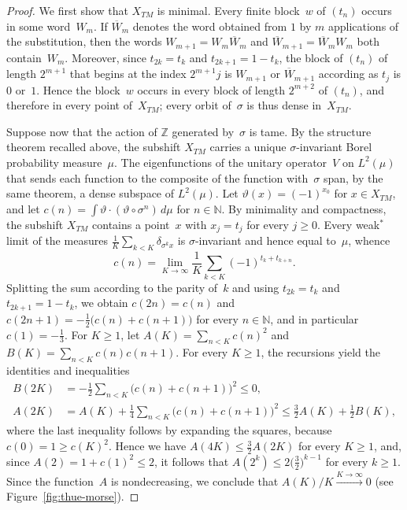 \documentclass[psamsfonts]{amsart}
\theoremstyle{definition}
\theoremstyle{remark}
\numberwithin{equation}{section}
\begin{document}
\begin{proof}
We first show that $X_{TM}$ is minimal.
Every finite block~$w$ of $(t_n)$ occurs in some word~$W_m$.
If $\overline{W}_m$ denotes the word obtained from $1$ by $m$ applications of the substitution, then the words $W_{m+1}=W_m\overline{W}_m$ and $\overline{W}_{m+1}=\overline{W}_mW_m$ both contain~$W_m$.
Moreover, since $t_{2k}=t_k$ and $t_{2k+1}=1-t_k$, the block of $(t_n)$ of length $2^{m+1}$ that begins at the index $2^{m+1}j$ is $W_{m+1}$ or $\overline{W}_{m+1}$ according as $t_j$ is $0$ or~$1$.
Hence the block~$w$ occurs in every block of length $2^{m+2}$ of $(t_n)$, and therefore in every point of~$X_{TM}$;
every orbit of~$\sigma$ is thus dense in~$X_{TM}$.

Suppose now that the action of $\mathbb{Z}$ generated by~$\sigma$ is tame.
By the structure theorem recalled above, the subshift $X_{TM}$ carries a unique $\sigma$-invariant Borel probability measure~$\mu$.
The eigenfunctions of the unitary operator~$V$ on $L^2(\mu)$ that sends each function to the composite of the function with~$\sigma$ span, by the same theorem, a dense subspace of $L^2(\mu)$.
Let $\vartheta(x)=(-1)^{x_0}$ for $x\in X_{TM}$, and let $c(n)=\int \vartheta\cdot(\vartheta\circ\sigma^n)\,d\mu$ for $n\in\mathbb{N}$.
By minimality and compactness, the subshift $X_{TM}$ contains a point~$x$ with $x_j=t_j$ for every $j\ge0$.
Every weak$^*$ limit of the measures $\frac1K\sum_{k<K}\delta_{\sigma^kx}$ is $\sigma$-invariant and hence equal to~$\mu$, whence
\[
c(n)=\lim_{K\to\infty}\frac1K\sum_{k<K}(-1)^{t_k+t_{k+n}} .
\]
Splitting the sum according to the parity of~$k$ and using $t_{2k}=t_k$ and $t_{2k+1}=1-t_k$, we obtain $c(2n)=c(n)$ and $c(2n+1)=-\frac12\bigl(c(n)+c(n+1)\bigr)$ for every $n\in\mathbb{N}$, and in particular $c(1)=-\frac13$.
For $K\ge1$, let $A(K)=\sum_{n<K}c(n)^2$ and $B(K)=\sum_{n<K}c(n)c(n+1)$.
For every $K\ge1$, the recursions yield the identities and inequalities
\begin{align*}
B(2K)&=-\tfrac12\sum_{n<K}\bigl(c(n)+c(n+1)\bigr)^2\le0,\\
A(2K)&=A(K)+\tfrac14\sum_{n<K}\bigl(c(n)+c(n+1)\bigr)^2\le\tfrac32A(K)+\tfrac12B(K),
\end{align*}
where the last inequality follows by expanding the squares, because $c(0)=1\ge c(K)^2$.
Hence we have $A(4K)\le\frac32A(2K)$ for every $K\ge1$, and, since $A(2)=1+c(1)^2\le2$, it follows that $A(2^k)\le2\bigl(\frac32\bigr)^{k-1}$ for every $k\ge1$.
Since the function~$A$ is nondecreasing, we conclude that $A(K)/K\xrightarrow{K\to\infty}0$ (see Figure~\ref{fig:thue-morse}).

\end{proof}
\end{document}
